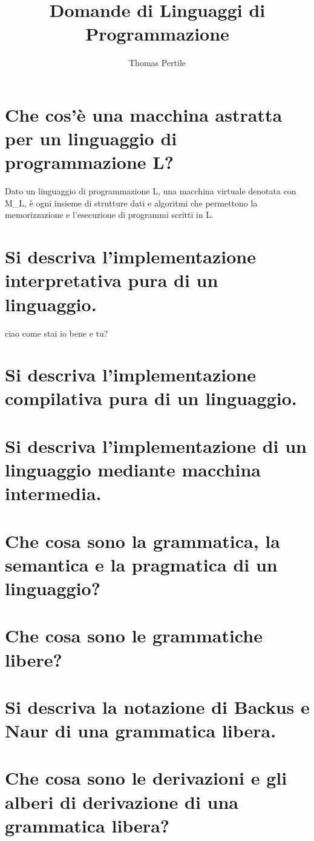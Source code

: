 \documentclass[a4paper, 10pt, italian]{article} %
\author{Thomas Pertile} %
\title{Domande di Linguaggi di Programmazione} %
\begin{document}
\maketitle %

\section{Che cos’\`{e} una macchina astratta per un linguaggio di programmazione L?} %
Dato un linguaggio di programmazione L, una macchina virtuale denotata con M_L, \`{e} ogni insieme di strutture dati e algoritmi che permettono la memorizzazione e l'esecuzione di programmi scritti in L. 

\section{Si descriva l’implementazione interpretativa pura di un linguaggio.}
ciao come stai io bene e tu?

\section{Si descriva l’implementazione compilativa pura di un linguaggio.}

\section{Si descriva l’implementazione di un linguaggio mediante macchina intermedia.}

\section{Che cosa sono la grammatica, la semantica e la pragmatica di un linguaggio?}

\section{Che cosa sono le grammatiche libere?}

\section{Si descriva la notazione di Backus e Naur di una grammatica libera.}

\section{Che cosa sono le derivazioni e gli alberi di derivazione di una grammatica libera?}
\end{document}
